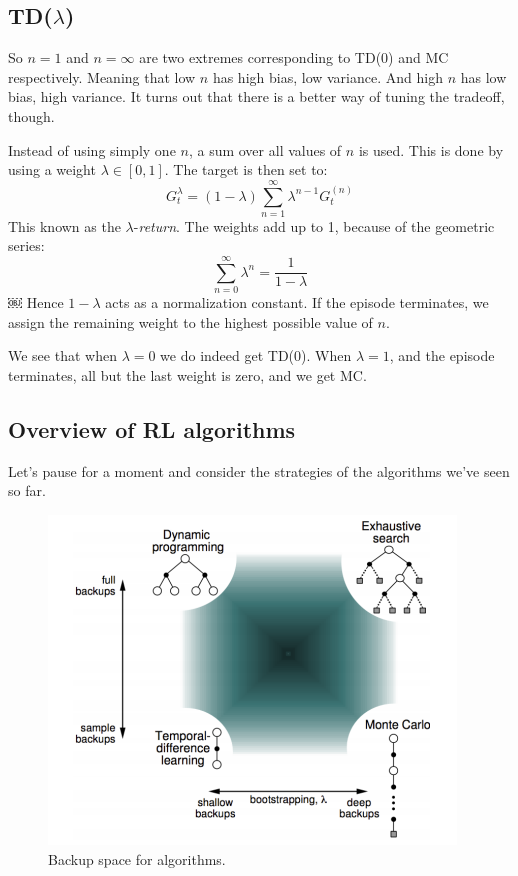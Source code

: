 \documentclass[12pt, a4paper]{article}
\numberwithin{equation}{section}
\begin{document}
\subsection{TD($\lambda$)}
So $n=1$ and $n=\infty$ are two extremes corresponding to TD(0) and MC respectively. Meaning that low $n$ has high bias, low variance. And high $n$ has low bias, high variance. It turns out that there is a better way of tuning the tradeoff, though.

Instead of using simply one $n$, a sum over all values of $n$ is used. This is done by using a weight $\lambda\in[0,1]$. The target is then set to:
\begin{equation}
G^\lambda_t=(1-\lambda)\sum_{n=1}^\infty\lambda^{n-1}G^{(n)}_t
\end{equation}
This known as the $\lambda$-\textit{return}. The weights add up to 1, because of the geometric series:
\begin{equation}
\sum_{n=0}^\infty\lambda^n=\frac{1}{1-\lambda}
\end{equation}￼
Hence $1-\lambda$ acts as a normalization constant. If the episode terminates, we assign the remaining weight to the highest possible value of $n$.

We see that when $\lambda=0$ we do indeed get TD(0). When $\lambda=1$, and the episode terminates, all but the last weight is zero, and we get MC.

\subsection{Overview of RL algorithms}
Let's pause for a moment and consider the strategies of the algorithms we've seen so far.

\begin{figure}
\centering
\includegraphics[width=\textwidth]{rl_overview}
\caption{Backup space for algorithms.}
\label{fig:rl_overview}
\end{figure}
\end{document}
